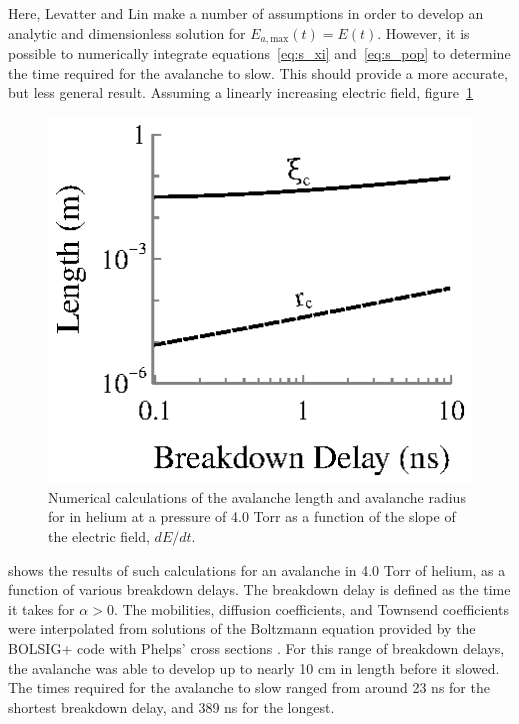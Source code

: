 Here, Levatter and Lin make a number of assumptions in order to develop an
analytic and dimensionless solution for $E_{a,\mathrm{max}}(t) = E(t)$. However,
it is possible to numerically integrate equations~\ref{eq:s_xi}
and~\ref{eq:s_pop} to determine the time required for the avalanche to slow.
This should provide a more accurate, but less general result. Assuming a
linearly increasing electric field, figure~\ref{fig:avalanche_lengths}
\begin{figure}
  \centering
  \includegraphics{./chapters/theory/figures/avalanche_lengths.eps}
  \caption{Numerical calculations of the avalanche length and avalanche radius for
    in helium at a pressure of 4.0 Torr as a function of the slope of the electric
    field, $dE/dt$.}
  \label{fig:avalanche_lengths}
\end{figure}
shows the results of such calculations for an avalanche in 4.0 Torr of helium,
as a function of various breakdown delays. The breakdown delay is defined as the
time it takes for $\alpha > 0$. The mobilities, diffusion coefficients, and
Townsend coefficients were interpolated from solutions of the Boltzmann equation
provided by the BOLSIG+ code with Phelps' cross sections \cite{Phelps2002}. For
this range of breakdown delays, the avalanche was able to develop up to nearly
10 cm in length before it slowed. The times required for the avalanche to slow
ranged from around 23 ns for the shortest breakdown delay, and 389 ns for the
longest.

